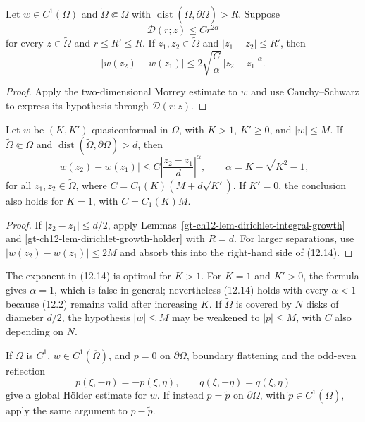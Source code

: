 \begin{lemma}
\label{gt-ch12-lem-dirichlet-growth-holder}
Let $w\in C^1(\Omega)$ and
$\widetilde\Omega\Subset\Omega$ with
$\operatorname{dist}(\widetilde\Omega,\partial\Omega)>R$.  Suppose
\[
\mathcal D(r;z)\le Cr^{2\alpha}
\]
for every $z\in\widetilde\Omega$ and $r\le R'\le R$.  If
$z_1,z_2\in\widetilde\Omega$ and $|z_1-z_2|\le R'$, then
\[
|w(z_2)-w(z_1)|
\le2\sqrt{\frac C\alpha}\,|z_2-z_1|^\alpha.
\]
\end{lemma}
\begin{proof}
\sketch Apply the two-dimensional Morrey estimate to $w$ and use
Cauchy--Schwarz to express its hypothesis through $\mathcal D(r;z)$.
\end{proof}

\begin{theorem}
\label{gt-ch12-thm-holder-quasiconformal-mappings}
Let $w$ be $(K,K')$-quasiconformal in $\Omega$, with $K>1$, $K'\ge0$, and
$|w|\le M$.  If
$\widetilde\Omega\Subset\Omega$ and
$\operatorname{dist}(\widetilde\Omega,\partial\Omega)>d$, then
\begin{equation}\tag{12.14}
|w(z_2)-w(z_1)|
\le C\left|\frac{z_2-z_1}{d}\right|^\alpha,
\qquad
\alpha=K-\sqrt{K^2-1},
\end{equation}
for all $z_1,z_2\in\widetilde\Omega$, where
$C=C_1(K)(M+d\sqrt{K'})$.  If $K'=0$, the conclusion also holds for
$K=1$, with $C=C_1(K)M$.
\end{theorem}
\begin{proof}
\sketch If $|z_2-z_1|\le d/2$, apply
Lemmas~\ref{gt-ch12-lem-dirichlet-integral-growth} and
\ref{gt-ch12-lem-dirichlet-growth-holder} with $R=d$.  For larger
separations, use $|w(z_2)-w(z_1)|\le2M$ and absorb this into the right-hand
side of (12.14).
\end{proof}

The exponent in (12.14) is optimal for $K>1$.  For $K=1$ and $K'>0$, the
formula gives $\alpha=1$, which is false in general; nevertheless (12.14)
holds with every $\alpha<1$ because (12.2) remains valid after increasing
$K$.  If $\widetilde\Omega$ is covered by $N$ disks of diameter $d/2$, the
hypothesis $|w|\le M$ may be weakened to $|p|\le M$, with $C$ also depending
on $N$.

If $\Omega$ is $C^1$, $w\in C^1(\overline\Omega)$, and $p=0$ on
$\partial\Omega$, boundary flattening and the odd-even reflection
\[
p(\xi,-\eta)=-p(\xi,\eta),
\qquad q(\xi,-\eta)=q(\xi,\eta)
\]
give a global H\"older estimate for $w$.  If instead
$p=\widetilde p$ on $\partial\Omega$, with
$\widetilde p\in C^1(\overline\Omega)$, apply the same argument to
$p-\widetilde p$.

